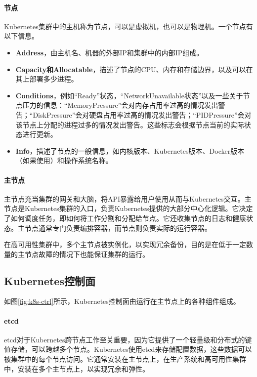 \documentclass[macfonts,master]{njuthesis}
\begin{document}
\paragraph{节点}
Kubernetes集群中的主机称为节点，可以是虚拟机，也可以是物理机。一个节点有以下信息\cite{k8sconcepts}。

\begin{itemize}
	\item \textbf{Address}，由主机名、机器的外部IP和集群中的内部IP组成。
	\item \textbf{Capacity和Allocatable}，描述了节点的CPU、内存和存储边界，以及可以在其上部署多少进程。
	\item \textbf{Conditions}，例如“Ready”状态，“NetworkUnavailable状态”以及一些关于节点压力的信息：“MemoryPressure”会对内存占用率过高的情况发出警告；“DiskPressure”会对硬盘占用率过高的情况发出警告；“PIDPressure”会对该节点上分配的进程过多的情况发出警告。这些标志会根据节点当前的实际状态进行更新。
	\item \textbf{Info}，描述了节点的一般信息，如内核版本、Kubernetes版本、Docker版本（如果使用）和操作系统名称。
\end{itemize}

\paragraph{主节点}
主节点充当集群的网关和大脑，将API暴露给用户使用从而与Kubernetes交互。主节点是Kubernetes集群的入口，负责Kubernetes提供的大部分中心化逻辑。它决定了如何调度任务，即如何将工作分割和分配给节点。它还收集节点的日志和健康状态。主节点通常专门负责编排容器，而节点则负责实际的运行容器。

在高可用性集群中，多个主节点被实例化，以实现冗余备份，目的是在低于一定数量的主节点故障的情况下也能保证集群的运行\cite{ha}。

\subsection{Kubernetes控制面}
如图\ref{fig:k8s-ctrl}所示，Kubernetes控制面由运行在主节点上的各种组件组成。

\paragraph{etcd}
etcd对于Kubernetes跨节点工作至关重要，因为它提供了一个轻量级和分布式的键值存储，可以跨越多个节点。Kubernetes使用etcd来存储配置数据，这些数据可以被集群中的每个节点访问。它通常安装在主节点上，在生产系统和高可用性集群中，安装在多个主节点上，以实现冗余和弹性。
\end{document}
